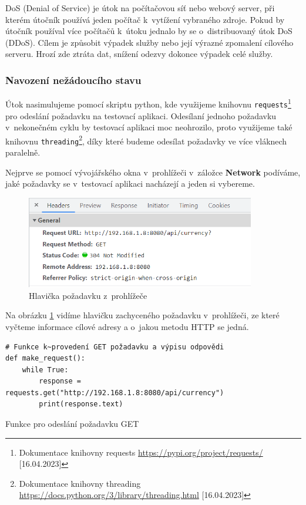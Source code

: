 DoS (Denial of Service) je útok na počítačovou síť nebo webový server, při kterém útočník používá jeden počítač k~vytížení vybraného zdroje. Pokud by útočník používal více počítačů k~útoku jednalo by se o~distribuovaný útok DoS (DDoS).  Cílem je způsobit výpadek služby nebo její výrazné zpomalení cílového serveru. Hrozí zde ztráta dat, snížení odezvy dokonce výpadek celé služby.

\subsubsection{Navození nežádoucího stavu}

Útok nasimulujeme pomocí skriptu python, kde využijeme knihovnu \texttt{requests}\footnote{Dokumentace knihovny requests \url{https://pypi.org/project/requests/} [16.04.2023]} pro odeslání požadavku na testovací aplikaci. Odesílaní jednoho požadavku v~nekonečném cyklu by testovací aplikaci moc neohrozilo, proto využijeme také knihovnu \texttt{threading}\footnote{Dokumentace knihovny threading \url{https://docs.python.org/3/library/threading.html} [16.04.2023]}, díky které budeme odesílat požadavky ve více vláknech paralelně.

Nejprve se pomocí vývojářského okna v~prohlížeči v~záložce \textbf{Network} podíváme, jaké požadavky se v~testovací aplikaci nacházejí a jeden si vybereme.

\begin{figure}[H]
  \centering
  \includegraphics[width=10cm]{obrazky-figures/hlavicka.png}
  \caption{Hlavička požadavku z~prohlížeče}
  \label{fig:header}
\end{figure}

Na obrázku \ref{fig:header} vidíme hlavičku zachyceného požadavku v~prohlížeči, ze které vyčteme informace cílové adresy a o~jakou metodu HTTP se jedná.

\begin{listing}[H]
    \begin{verbatim}
# Funkce k~provedení GET požadavku a výpisu odpovědi
def make_request():
    while True:
        response = requests.get("http://192.168.1.8:8080/api/currency")
        print(response.text)
\end{verbatim}
    \caption{Funkce pro odeslání požadavku GET}
    \label{lst:dos}
\end{listing}

